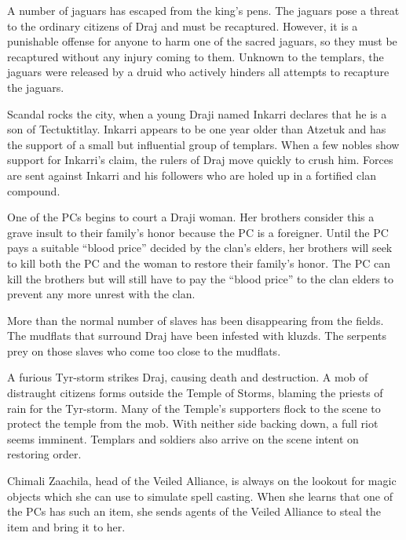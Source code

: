 {
	\item A number of jaguars has escaped from the king's pens. The jaguars pose a threat to the ordinary citizens of Draj and must be recaptured. However, it is a punishable offense for anyone to harm one of the sacred jaguars, so they must be recaptured without any injury coming to them. Unknown to the templars, the jaguars were released by a druid who actively hinders all attempts to recapture the jaguars.
	\item Scandal rocks the city, when a young Draji named Inkarri declares that he is a son of Tectuktitlay. Inkarri appears to be one year older than Atzetuk and has the support of a small but influential group of templars. When a few nobles show support for Inkarri's claim, the rulers of Draj move quickly to crush him. Forces are sent against Inkarri and his followers who are holed up in a fortified clan compound.
	\item One of the PCs begins to court a Draji woman. Her brothers consider this a grave insult to their family's honor because the PC is a foreigner. Until the PC pays a suitable ``blood price'' decided by the clan's elders, her brothers will seek to kill both the PC and the woman to restore their family's honor. The PC can kill the brothers but will still have to pay the ``blood price'' to the clan elders to prevent any more unrest with the clan.
	\item More than the normal number of slaves has been disappearing from the fields. The mudflats that surround Draj have been infested with kluzds. The serpents prey on those slaves who come too close to the mudflats.
	\item A furious Tyr-storm strikes Draj, causing death and destruction. A mob of distraught citizens forms outside the Temple of Storms, blaming the priests of rain for the Tyr-storm. Many of the Temple's supporters flock to the scene to protect the temple from the mob. With neither side backing down, a full riot seems imminent. Templars and soldiers also arrive on the scene intent on restoring order.
	\item Chimali Zaachila, head of the Veiled Alliance, is always on the lookout for magic objects which she can use to simulate spell casting. When she learns that one of the PCs has such an item, she sends agents of the Veiled Alliance to steal the item and bring it to her. 
}
